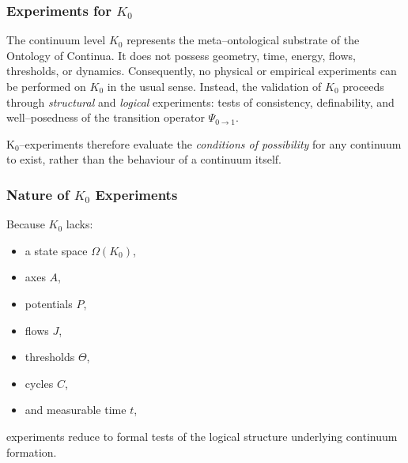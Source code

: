 
\subsubsection{Experiments for \texorpdfstring{$K_0$}{K_0}}
\label{sec:experiments-k0}

The continuum level $K_0$ represents the meta–ontological substrate of the
Ontology of Continua.
It does not possess geometry, time, energy, flows, thresholds, or dynamics.
Consequently, no physical or empirical experiments can be performed on $K_0$
in the usual sense.
Instead, the validation of $K_0$ proceeds through \emph{structural} and
\emph{logical} experiments: tests of consistency, definability, and
well–posedness of the transition operator $\Psi_{0\to 1}$.

K$_0$–experiments therefore evaluate the \emph{conditions of possibility} for
any continuum to exist, rather than the behaviour of a continuum itself.


\subsubsection{Nature of \texorpdfstring{$K_0$}{K_0} Experiments}

Because $K_0$ lacks:
\begin{itemize}
    \item a state space $\Omega(K_0)$,
    \item axes $A$,
    \item potentials $P$,
    \item flows $J$,
    \item thresholds $\Theta$,
    \item cycles $C$,
    \item and measurable time $t$,
\end{itemize}
experiments reduce to formal tests of the logical structure underlying
continuum formation.

